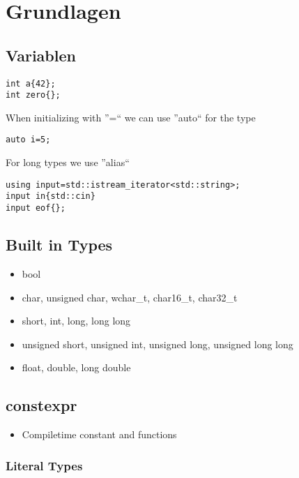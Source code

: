 \section{Grundlagen}

\subsection{Variablen}
\begin{lstlisting}
int a{42};
int zero{};
\end{lstlisting}
When initializing with ''=`` we can use ''auto`` for the type
\begin{lstlisting}
auto i=5;
\end{lstlisting}

For long types we use ''alias``
\begin{lstlisting}
using input=std::istream_iterator<std::string>;
input in{std::cin}
input eof{};
\end{lstlisting}

\subsection{Built in Types}
\begin{itemize}
\item bool
\item char, unsigned char, wchar\_t, char16\_t, char32\_t
\item short, int, long, long long
\item unsigned short, unsigned int, unsigned long, unsigned long long
\item float, double, long double
\end{itemize}

\subsection{constexpr}
\begin{itemize}
\item Compiletime constant and functions
\end{itemize}
\subsubsection{Literal Types}
